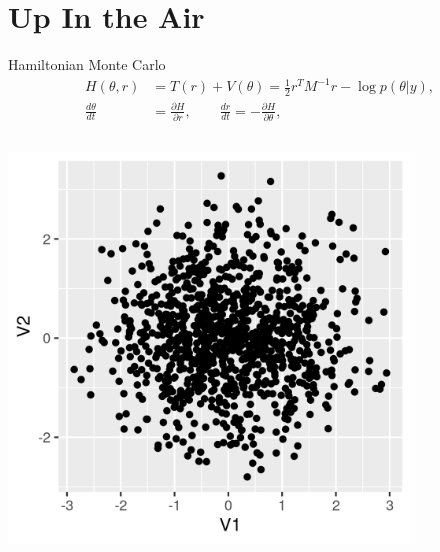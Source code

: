 \documentclass[bigger]{beamer}
\begin{document}
\section{Up In the Air}
\label{sec:org41c2262}
\begin{frame}[label={sec:org9d561ff}]{Hamiltonian Monte Carlo}
\begin{align*}
  H(\theta, r) &= T(r) + V(\theta) = \frac{1}{2}r^TM^{-1}r - \log{p(\theta|y)},\\
  \frac{d\theta}{dt} &= \frac{\partial H}{\partial r},\qquad
  \frac{dr}{dt} = -\frac{\partial H}{\partial \theta},
\end{align*}
\begin{columns}
\begin{column}{0.5\columnwidth}
\begin{center}
\includegraphics[width=0.8\textwidth]{./figure/d2_normal_point.png}
\end{center}
\end{column}


\end{columns}
\end{frame}
\end{document}
